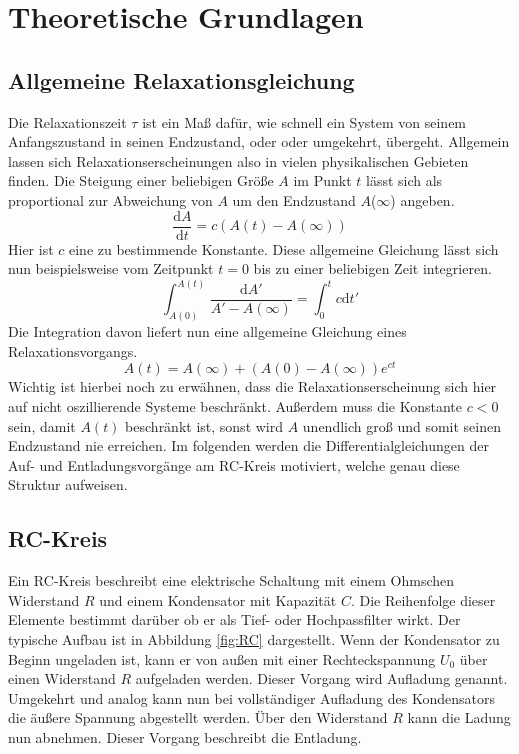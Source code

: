 \section{Theoretische Grundlagen}
\subsection{Allgemeine Relaxationsgleichung}
Die Relaxationszeit $\tau$ ist ein Maß dafür, wie schnell ein System von seinem Anfangszustand in seinen Endzustand, oder oder umgekehrt, übergeht. Allgemein lassen sich Relaxationserscheinungen also in vielen physikalischen Gebieten finden.
Die Steigung einer beliebigen Größe $A$ im Punkt $t$ lässt sich als proportional zur Abweichung von $A$ um den Endzustand $A$($\infty$) angeben.
\begin{equation*}
    \frac{\text{d}A}{\text{d}t} =  c (A(t) - A(\infty))
\end{equation*}
Hier ist $c$ eine zu bestimmende Konstante.
Diese allgemeine Gleichung lässt sich nun beispielsweise vom Zeitpunkt $t=0$ bis zu einer beliebigen Zeit integrieren.
\begin{equation*}
    \int_{A(0)}^{A(t)} \frac{\text{d}A'}{A' - A(\infty)} = \int_{0}^{t} c \text{d}t'
\end{equation*}
Die Integration davon liefert nun eine allgemeine Gleichung eines Relaxationsvorgangs.
\begin{equation*}
    A(t) = A(\infty) + (A(0) - A(\infty))e^{ct}
\end{equation*}
Wichtig ist hierbei noch zu erwähnen, dass die Relaxationserscheinung sich hier auf nicht oszillierende Systeme beschränkt.
Außerdem muss die Konstante $c < 0$ sein, damit $A(t)$ beschränkt ist, sonst wird $A$ unendlich groß und somit seinen Endzustand nie erreichen.
Im folgenden werden die Differentialgleichungen der Auf- und Entladungsvorgänge am RC-Kreis motiviert, welche genau diese Struktur aufweisen.
\subsection{RC-Kreis}
Ein RC-Kreis beschreibt eine elektrische Schaltung mit einem Ohmschen Widerstand $R$ und einem Kondensator mit Kapazität $C$. Die Reihenfolge dieser Elemente bestimmt darüber ob er als Tief- oder Hochpassfilter wirkt. Der typische Aufbau ist in Abbildung \ref{fig:RC} dargestellt. Wenn der Kondensator zu Beginn ungeladen ist, kann er von außen mit einer Rechteckspannung $U_{0}$ über einen Widerstand $R$ aufgeladen werden. Dieser Vorgang wird Aufladung genannt. Umgekehrt und analog kann nun bei vollständiger Aufladung des Kondensators die äußere Spannung abgestellt werden. Über den Widerstand $R$ kann die Ladung nun abnehmen. Dieser Vorgang beschreibt die Entladung.
